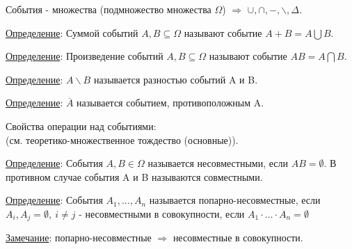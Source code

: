 События - множества (подмножество множества $\Omega$) $\Rightarrow$ $\cup, \cap, -, \backslash, \Delta$.

\underline{Определение}: Суммой событий $A, B \subseteq \Omega$ называют событие $A+B = A \bigcup B$.

\underline{Определение}: Произведение событий $A, B \subseteq \Omega$ называют событие $AB = A \bigcap B$.


\underline{Определение}: $A \backslash B$ называется разностью событий A и B.

\underline{Определение}: $\overline{A}$ называется событием, противоположным A.

Свойства операции над событиями: \\
(см. теоретико-множественное тождество (основные)).

\underline{Определение}: События $A, B \in \Omega$ называется несовместными, если $AB = \emptyset$. В противном случае события A и B называются совместными.

\underline{Определение}: События $A_1, ..., A_n$ называется попарно-несовместные, если $A_i, A_j = \emptyset, \ i \neq j$ 
- несовместными в совокупности, если $A_1 \cdot \ldots \cdot A_n = \emptyset$

\underline{Замечание}: попарно-несовместные $\Rightarrow$ несовместные в совокупности.